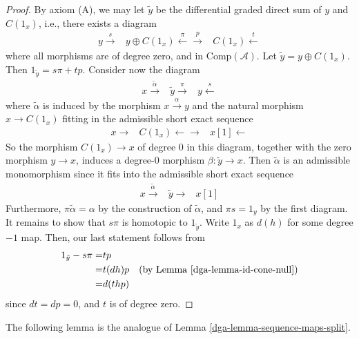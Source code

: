 \begin{proof}

By axiom (A), we may let $\tilde{y}$ be the differential graded direct
sum of $y$ and $C(1_x)$, i.e., there exists a diagram
$$
\begin{array}{ccc}y \overset{s}{\longrightarrow} & y\oplus C(1_x) \overset{\pi}{\longleftarrow}\overset{p}{\longrightarrow} & C(1_x)\overset{t}{\longleftarrow}\end{array}
$$
where all morphisms are of degree zero, and in
$\text{Comp}(\mathcal{A})$. Let $\tilde{y} = y \oplus C(1_x)$.
Then $1_{\tilde{y}} = s\pi + tp$. Consider now the diagram
$$
\begin{array}{ccc}x \overset{\tilde{\alpha}}{\longrightarrow} & \tilde{y} \overset{\pi}{\longrightarrow} & y\overset{s}{\longleftarrow}\end{array}
$$
where $\tilde{\alpha}$ is induced by the morphism $x\xrightarrow{\alpha}y$
and the natural morphism $x\to C(1_x)$ fitting in the admissible
short exact sequence
$$
\begin{array}{ccc}x \longrightarrow & C(1_x) \longleftarrow\longrightarrow & x[1]\longleftarrow\end{array}
$$
So the morphism $C(1_x)\to x$ of degree 0 in this diagram,
together with the zero morphism $y\to x$, induces a degree-0
morphism $\beta : \tilde{y} \to x$. Then $\tilde{\alpha}$ is an
admissible monomorphism since it fits into the admissible short
exact sequence
$$
\begin{array}{ccc}x\overset{\tilde{\alpha}}{\longrightarrow} & \tilde{y} \longrightarrow & x[1]\end{array}
$$
Furthermore, $\pi\tilde{\alpha} = \alpha$ by the construction of
$\tilde{\alpha}$, and $\pi s = 1_y$ by the first diagram. It
remains to show that $s\pi$ is homotopic to $1_{\tilde{y}}$.
Write $1_x$ as $d(h)$ for some degree $-1$ map. Then, our
last statement follows from
\begin{align*}
1_{\tilde{y}} - s\pi
= &
tp \\
= &
t(dh)p\quad\text{(by Lemma \ref{dga-lemma-id-cone-null})} \\
= &
d(thp)
\end{align*}
since $dt = dp = 0$, and $t$ is of degree zero.
\end{proof}

The following lemma is the analogue of Lemma \ref{dga-lemma-sequence-maps-split}.

